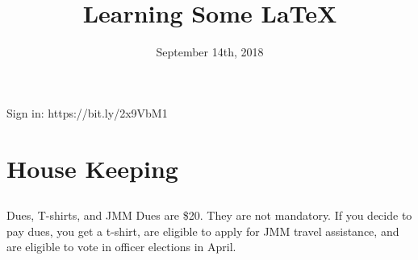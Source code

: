 \documentclass[xcolor=dvipsnames]{beamer}
\title[UCF Math Club Meeting 2]{Learning Some LaTeX}
\author{}
\institute{University of Central Florida}
\date{\scriptsize{September 14th, 2018}}
\begin{document}
\begin{frame}
  \titlepage
  \vfill
    \Huge Sign in: \color{blue} https://bit.ly/2x9VbM1
\end{frame}

\section{House Keeping}
\subsection{}

\begin{frame}{Dues, T-shirts, and JMM}
Dues are \$20. They are not mandatory. \newline
If you decide to pay dues, you get a t-shirt,  are eligible to apply for JMM travel assistance, and are eligible to vote in officer elections in April.\newline

\end{frame}
\end{document}

